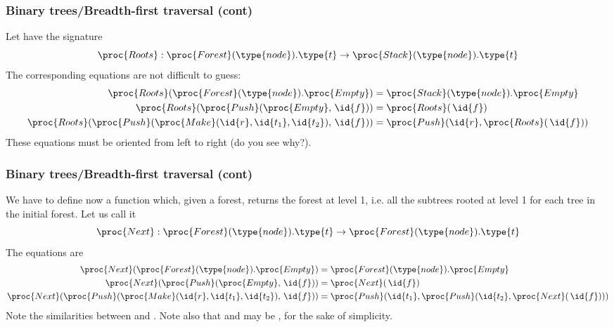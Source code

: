 %
\begin{frame}
\frametitle{Binary trees/Breadth-first traversal (cont)}
\label{roots}

Let  have the signature
\[
\proc{Roots} : \proc{Forest}(\type{node}).\type{t} \rightarrow
\proc{Stack}(\type{node}).\type{t}
\]
The corresponding equations are not difficult to guess:
\begin{align*}
   \proc{Roots} (\proc{Forest}(\type{node}).\proc{Empty}) 
&= \proc{Stack} (\type{node}).\proc{Empty}\\
   \proc{Roots} (\proc{Push} (\proc{Empty}, \,\id{f}))
&= \proc{Roots} (\,\id{f})\\
   \proc{Roots} (\proc{Push} (\proc{Make} (\id{r}, \id{t_1},
   \id{t_2}), \,\id{f}))
&= \proc{Push} (\id{r}, \proc{Roots} (\,\id{f}))
\end{align*}
These equations must be oriented from left to right (do you see
why?).

\end{frame}

%
\begin{frame}
\frametitle{Binary trees/Breadth-first traversal (cont)}
\label{next_level}

We have to define now a function which, given a forest, returns the
forest at level 1, i.e. all the subtrees rooted at level 1 for each
tree in the initial forest. Let us call it 
\[
\proc{Next} : \proc{Forest}(\type{node}).\type{t} \rightarrow
\proc{Forest}(\type{node}).\type{t} 
\]
The equations are 
\begin{align*}
   \proc{Next} (\proc{Forest}(\type{node}).\proc{Empty}) 
&= \proc{Forest} (\type{node}).\proc{Empty}\\
   \proc{Next} (\proc{Push} (\proc{Empty}, \,\id{f}))
&= \proc{Next} (\,\id{f})\\
   \proc{Next} (\proc{Push} (\proc{Make} (\id{r}, \id{t_1},
   \id{t_2}), \,\id{f}))
&= \proc{Push} (\id{t_1}, \proc{Push} (\id{t_2}, \proc{Next}
   (\,\id{f})))
\end{align*}
Note the similarities between  and . Note
also that  and  may be , for the sake of
simplicity.

\end{frame}

